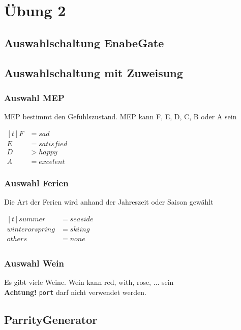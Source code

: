 \section{Übung 2}
\subsection{Auswahlschaltung EnabeGate}

\subsection{Auswahlschaltung mit Zuweisung}
\subsubsection{Auswahl MEP}
MEP bestimmt den Gefühlszustand.
MEP kann F, E, D, C, B oder A sein

$\begin{aligned}[t]
    F &= sad \\
    E &= satisfied\\
    D &> happy \\
    A &= excelent
\end{aligned}$


\subsubsection{Auswahl Ferien}
Die Art der Ferien wird anhand der Jahreszeit oder Saison gewählt
 
$\begin{aligned}[t]
    summer &= seaside \\
    winter or spring &= skiing\\
    others &= none \\
\end{aligned}$

\subsubsection{Auswahl Wein}
Es gibt viele Weine.
Wein kann  red, with, rose, ... sein\\
\textbf{Achtung!} \verb?port? darf nicht verwendet werden. 
 

\subsection{ParrityGenerator}


